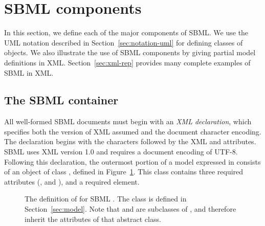 
\section{SBML components}
\label{sec:elements}

In this section, we define each of the major components of SBML.
We use the UML notation described in
Section~\ref{sec:notation-uml} for defining classes of objects.
We also illustrate the use of SBML components by giving partial
model definitions in XML.  Section~\ref{sec:xml-rep} provides many
complete examples of SBML in XML.


\subsection{The SBML container}
\label{sec:sbml}

All well-formed SBML documents must begin with an \emph{XML
  declaration}, which specifies both the version of XML assumed
and the document character encoding.  The declaration begins with
the characters  followed by the XML 
and  attributes.  SBML \thisL uses XML version 1.0
and requires a document encoding of UTF-8.  Following this
declaration, the outermost portion of a model expressed in \thisL
consists of an object of class \Sbml, defined in
Figure~\ref{fig:sbml}.  This class contains three required
attributes (,  and ), and
a required  element.

\begin{figure}[htb]
  \centering
  \small
  \caption{The definition of \Sbml for SBML \thisLV.  The class
    \Model is defined in Section~\ref{sec:model}.  Note that \Sbml
    and \Model are subclasses of \SBase, and therefore inherit
    the attributes of that abstract class.}
  \label{fig:sbml}
\end{figure}

